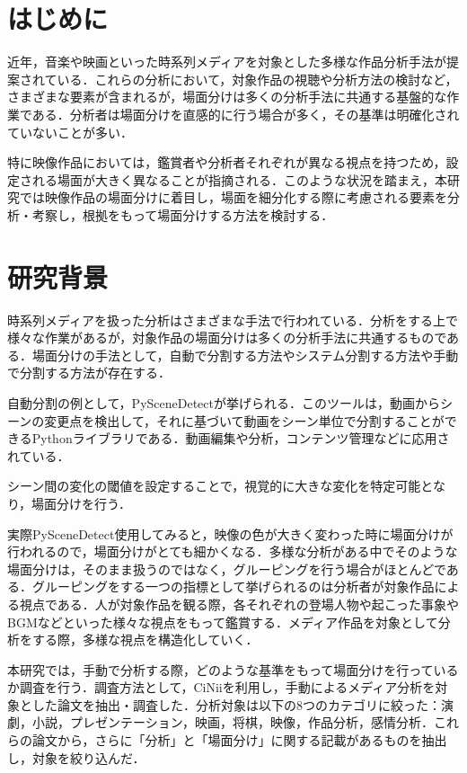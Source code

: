 
\section{はじめに}

近年，音楽や映画といった時系列メディアを対象とした多様な作品分析手法が提案されている．これらの分析において，対象作品の視聴や分析方法の検討など，さまざまな要素が含まれるが，場面分けは多くの分析手法に共通する基盤的な作業である．分析者は場面分けを直感的に行う場合が多く，その基準は明確化されていないことが多い．

特に映像作品においては，鑑賞者や分析者それぞれが異なる視点を持つため，設定される場面が大きく異なることが指摘される．このような状況を踏まえ，本研究では映像作品の場面分けに着目し，場面を細分化する際に考慮される要素を分析・考察し，根拠をもって場面分けする方法を検討する．

\section{研究背景}
時系列メディアを扱った分析はさまざまな手法で行われている．分析をする上で様々な作業があるが，対象作品の場面分けは多くの分析手法に共通するものである．場面分けの手法として，自動で分割する方法やシステム分割する方法や手動で分割する方法が存在する．

自動分割の例として，PySceneDetect\cite{PySceneDetect}が挙げられる．このツールは，動画からシーンの変更点を検出して，それに基づいて動画をシーン単位で分割することができるPythonライブラリである．動画編集や分析，コンテンツ管理などに応用されている．

シーン間の変化の閾値を設定することで，視覚的に大きな変化を特定可能となり，場面分けを行う．

実際PySceneDetect使用してみると，映像の色が大きく変わった時に場面分けが行われるので，場面分けがとても細かくなる．多様な分析がある中でそのような場面分けは，そのまま扱うのではなく，グルーピングを行う場合がほとんどである．グルーピングをする一つの指標として挙げられるのは分析者が対象作品による視点である．人が対象作品を観る際，各それぞれの登場人物や起こった事象やBGMなどといった様々な視点をもって鑑賞する．メディア作品を対象として分析をする際，多様な視点を構造化していく．

本研究では，手動で分析する際，どのような基準をもって場面分けを行っているか調査を行う．調査方法として，CiNii\cite{CiNii}を利用し，手動によるメディア分析を対象とした論文を抽出・調査した．分析対象は以下の8つのカテゴリに絞った：演劇，小説，プレゼンテーション，映画，将棋，映像，作品分析，感情分析．これらの論文から，さらに「分析」と「場面分け」に関する記載があるものを抽出し，対象を絞り込んだ．

